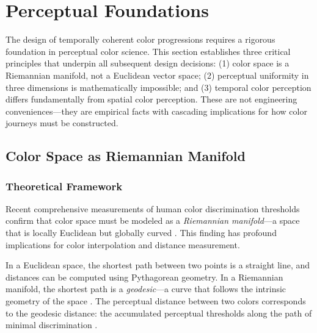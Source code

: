 
\section{Perceptual Foundations}
\label{sec:perceptual-foundations}

The design of temporally coherent color progressions requires a rigorous foundation in perceptual color science. This section establishes three critical principles that underpin all subsequent design decisions: (1) color space is a Riemannian manifold, not a Euclidean vector space; (2) perceptual uniformity in three dimensions is mathematically impossible; and (3) temporal color perception differs fundamentally from spatial color perception. These are not engineering conveniences—they are empirical facts with cascading implications for how color journeys must be constructed.

\subsection{Color Space as Riemannian Manifold}
\label{sec:riemannian-color}

\subsubsection{Theoretical Framework}

Recent comprehensive measurements of human color discrimination thresholds confirm that color space must be modeled as a \emph{Riemannian manifold}—a space that is locally Euclidean but globally curved \citep{hong2024}. This finding has profound implications for color interpolation and distance measurement.

In a Euclidean space, the shortest path between two points is a straight line, and distances can be computed using Pythagorean geometry. In a Riemannian manifold, the shortest path is a \emph{geodesic}—a curve that follows the intrinsic geometry of the space \citep{hong2024}. The perceptual distance between two colors corresponds to the geodesic distance: the accumulated perceptual thresholds along the path of minimal discrimination \citep{hong2024}.

